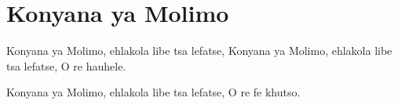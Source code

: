 \starttocol
\chapter{Konyana ya Molimo}
\nexttocol
\hfill{\it }
\stoptocol
\starttocol
\startlines
{\sc Konyana} ya Molimo, 
ehlakola libe tsa lefatse,
Konyana ya Molimo, 
ehlakola libe tsa lefatse,
O re hauhele.

Konyana ya Molimo, 
ehlakola libe tsa lefatse,
O re fe khutso.
\stoplines
\nexttocol

\stoptocol
